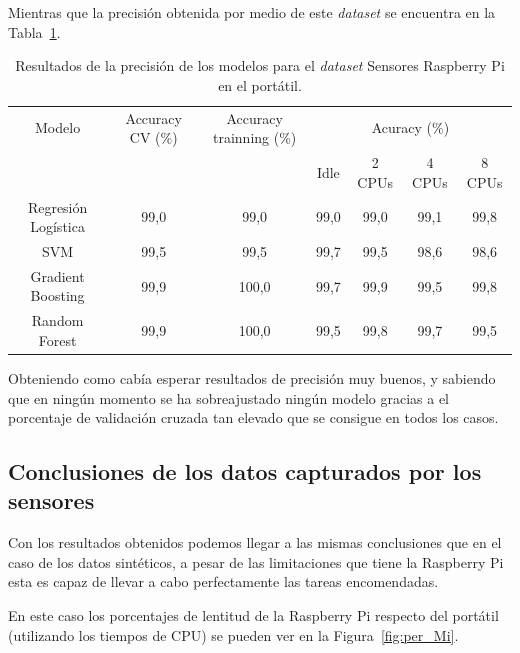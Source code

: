\documentclass[a4paper, 12pt]{book}
\begin{document}
Mientras que la precisión obtenida por medio de este \textit{dataset} se encuentra en la Tabla~\ref{tab:acc_senspc}.\\
\begin{table}[htb]
\renewcommand{\arraystretch}{1.5}
\begin{adjustbox}{width=\textwidth}
\centering
    \begin{tabular}{c  c  c  c  c  c  c}
    \toprule
    Modelo & Accuracy CV (\%) & Accuracy trainning (\%) & \multicolumn{4}{c}{Acuracy (\%)} \\
    \cline{4-7}
     &  &   &  Idle & 2 CPUs & 4 CPUs & 8 CPUs \\
     \midrule
     Regresión Logística & 99,0 & 99,0 & 99,0 & 99,0 & 99,1 & 99,8\\
     SVM & 99,5 & 99,5 & 99,7 & 99,5 & 98,6 & 98,6\\
     Gradient Boosting & 99,9 & 100,0 & 99,7 & 99,9 & 99,5 & 99,8\\
     Random Forest & 99,9 & 100,0 & 99,5 & 99,8 & 99,7 & 99,5\\
    \bottomrule
    \end{tabular}
\end{adjustbox}
\caption{Resultados de la precisión de los modelos para el \textit{dataset} Sensores Raspberry Pi en el portátil.}
\label{tab:acc_senspc}
\end{table}

Obteniendo como cabía esperar resultados de precisión muy buenos, y sabiendo que en ningún momento se ha sobreajustado ningún modelo gracias a el porcentaje de validación cruzada tan elevado que se consigue en todos los casos.

\subsection{Conclusiones de los datos capturados por los sensores}
\label{subsec:conclusiones_sensados}

Con los resultados obtenidos podemos llegar a las mismas conclusiones que en el caso de los datos sintéticos, a pesar de las limitaciones que tiene la Raspberry Pi esta es capaz de llevar a cabo perfectamente las tareas encomendadas.

En este caso los porcentajes de lentitud de la Raspberry Pi respecto del portátil (utilizando los tiempos de CPU) se pueden ver en la Figura~\ref{fig:per_Mi}.
\end{document}
